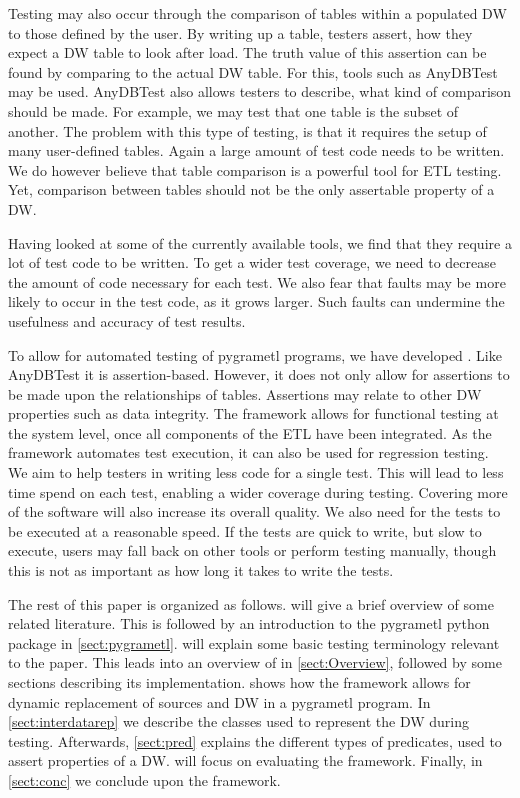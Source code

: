 Testing may also occur through the comparison of tables within a populated DW to those defined by the user. By writing up a table, testers assert, how they expect a DW table to look after load. The truth value of this assertion can be found by comparing to the actual DW table. For this, tools such as AnyDBTest\cite{AnyDbTest} may be used. AnyDBTest also allows testers to describe, what kind of comparison should be made. For example, we may test that one table is the subset of another. The problem with this type of testing, is that it requires the setup of many user-defined tables. Again a large amount of test code needs to be written. We do however believe that table comparison is a powerful tool for ETL testing. Yet, comparison between tables should not be the only assertable property of a DW.

Having looked at some of the currently available tools, we find that they require a lot of test code to be written. To get a wider test coverage, we need to decrease the amount of code necessary for each test. We also fear that faults may be more likely to occur in the test code, as it grows larger. Such faults can undermine the usefulness and accuracy of test results.

To allow for automated testing of pygrametl programs, we have developed \FW{}. Like AnyDBTest it is assertion-based. However, it does not only allow for assertions to be made upon the relationships of tables. Assertions may relate to other DW properties such as data integrity. The framework allows for functional testing at the system level, once all components of the ETL have been integrated. As the framework automates test execution, it can also be used for regression testing. We aim to help testers in writing less code for a single test. This will lead to less time spend on each test, enabling a wider coverage during testing. Covering more of the software will also increase its overall quality. We also need for the tests to be executed at a reasonable speed. If the tests are quick to write, but slow to execute, users may fall back on other tools or perform testing manually, though this is not as important as how long it takes to write the tests.

The rest of this paper is organized as follows.  will give a brief overview of some related literature. This is followed by an introduction to the pygrametl python package in \cref{sect:pygrametl}.  will explain some basic testing terminology relevant to the paper. This leads into an overview of \FW{} in \cref{sect:Overview}, followed by some sections describing its implementation.  shows how the framework allows for dynamic replacement of sources and DW in a pygrametl program.  In \cref{sect:interdatarep} we describe the classes used to represent the DW during testing. Afterwards, \cref{sect:pred} explains the different types of predicates, used to assert properties of a DW.  will focus on evaluating the framework. Finally, in \cref{sect:conc} we conclude upon the framework.


